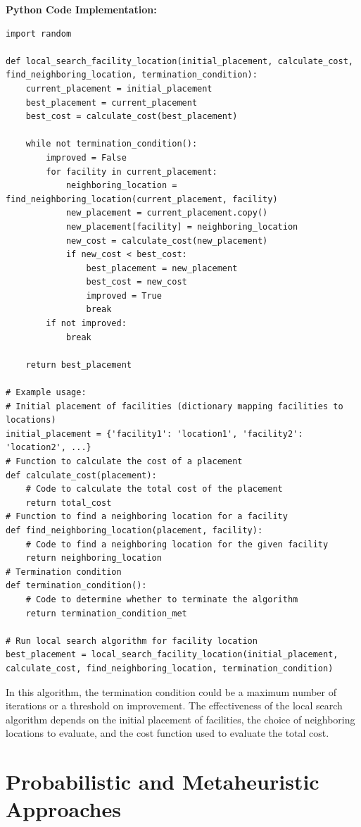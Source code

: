 \documentclass[12pt]{book} %
\begin{document}
\textbf{Python Code Implementation:}
\FloatBarrier
\begin{lstlisting}
import random

def local_search_facility_location(initial_placement, calculate_cost, find_neighboring_location, termination_condition):
    current_placement = initial_placement
    best_placement = current_placement
    best_cost = calculate_cost(best_placement)

    while not termination_condition():
        improved = False
        for facility in current_placement:
            neighboring_location = find_neighboring_location(current_placement, facility)
            new_placement = current_placement.copy()
            new_placement[facility] = neighboring_location
            new_cost = calculate_cost(new_placement)
            if new_cost < best_cost:
                best_placement = new_placement
                best_cost = new_cost
                improved = True
                break
        if not improved:
            break

    return best_placement

# Example usage:
# Initial placement of facilities (dictionary mapping facilities to locations)
initial_placement = {'facility1': 'location1', 'facility2': 'location2', ...}
# Function to calculate the cost of a placement
def calculate_cost(placement):
    # Code to calculate the total cost of the placement
    return total_cost
# Function to find a neighboring location for a facility
def find_neighboring_location(placement, facility):
    # Code to find a neighboring location for the given facility
    return neighboring_location
# Termination condition
def termination_condition():
    # Code to determine whether to terminate the algorithm
    return termination_condition_met

# Run local search algorithm for facility location
best_placement = local_search_facility_location(initial_placement, calculate_cost, find_neighboring_location, termination_condition)
\end{lstlisting}
\FloatBarrier

In this algorithm, the termination condition could be a maximum number of iterations or a threshold on improvement. The effectiveness of the local search algorithm depends on the initial placement of facilities, the choice of neighboring locations to evaluate, and the cost function used to evaluate the total cost.



\section{Probabilistic and Metaheuristic Approaches}
\end{document}
